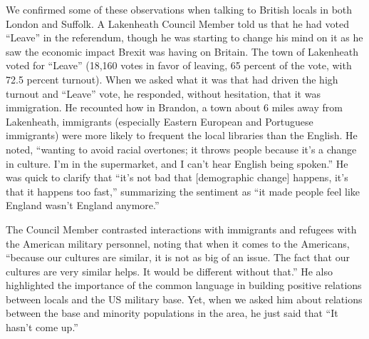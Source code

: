 We confirmed some of these observations when talking to British locals in both London and Suffolk. A Lakenheath Council Member told us that he had voted ``Leave'' in the referendum, though he was starting to change his mind on it as he saw the economic impact Brexit was having on Britain. The town of Lakenheath voted for ``Leave'' (18,160 votes in favor of leaving, 65 percent of the vote, with 72.5 percent turnout). When we asked what it was that had driven the high turnout and ``Leave'' vote, he responded, without hesitation, that it was immigration. He recounted how in Brandon, a town about 6 miles away from Lakenheath, immigrants (especially Eastern European and Portuguese immigrants) were more likely to frequent the local libraries than the English. He noted, ``wanting to avoid racial overtones; it throws people because it's a change in culture. I'm in the supermarket, and I can't hear English being spoken.'' He was quick to clarify that ``it's not bad that [demographic change] happens, it's that it happens too fast,'' summarizing the sentiment as ``it made people feel like England wasn't England anymore.''\cite{councilone20190718}

The Council Member contrasted interactions with immigrants and refugees with the American military personnel, noting that when it comes to the Americans, ``because our cultures are similar, it is not as big of an issue. The fact that our cultures are very similar helps. It would be different without that.'' He also highlighted the importance of the common language in building positive relations between locals and the US military base. Yet, when we asked him about relations between the base and minority populations in the area, he just said that ``It hasn't come up.''\cite[][Despite many active efforts to reach out and interview civil society leaders for minority groups in the area, we received no response. The lack of response is perhaps telling in and of itself, as we identified ourselves in all of our correspondence and calls as researchers based at US universities studying perceptions of the US military abroad.]{councilone20190718}

